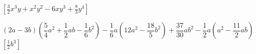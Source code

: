 \begin{esercizio}[\Ast]
\begin{enumeratea}
  \hfill $\left[\frac{3}{2}x^{3}y+x^{2}y^{2}-6{xy}^{3}+\frac{8}{3}y^{4}\right]$
 \item $(2a-3b)\left(\dfrac{5}{4}a^{2}+\dfrac{1}{2}{ab}-
        \dfrac{1}{6}b^{2}\right)-\dfrac{1}{6}a\left(12a^{2}-
        \dfrac{18}{5}b^{2}\right)+\dfrac{37}{30}ab^{2}-
        \dfrac{1}{2}a\left(a^{2}-\dfrac{11}{2}{ab}\right)$
  \hfill $\left[\frac{1}{2}b^{3}\right]$
 \end{enumeratea}
\end{esercizio}

